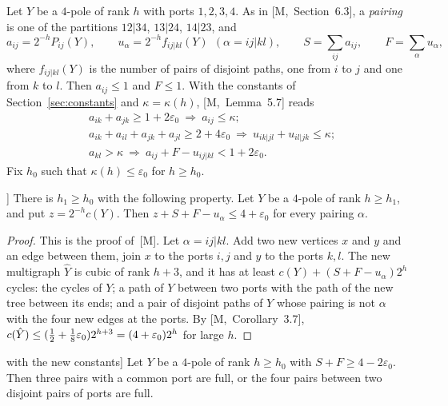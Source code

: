 \documentclass[11pt]{article}
\newcommand{\M}[1]{[M,~#1]}
\begin{document}
Let $Y$ be a $4$-pole of rank $h$ with ports $1,2,3,4$. As in \M{Section~6.3}, a \emph{pairing}
is one of the partitions $12|34$, $13|24$, $14|23$, and
\[
  a_{ij}=2^{-h}P_{ij}(Y),\qquad u_\alpha=2^{-h}f_{ij|kl}(Y)\ \ (\alpha=ij|kl),\qquad
  S=\sum_{ij}a_{ij},\qquad F=\sum_\alpha u_\alpha ,
\]
where $f_{ij|kl}(Y)$ is the number of pairs of disjoint paths, one from $i$ to $j$ and one from
$k$ to $l$. Then $a_{ij}\le1$ and $F\le1$. With the constants of Section~\ref{sec:constants} and
$\kappa=\kappa(h)$, \M{Lemma~5.7} reads
\begin{align}
  &a_{ik}+a_{jk}\ge1+2\varepsilon_0\ \Longrightarrow\ a_{ij}\le\kappa;\label{eq:T1}\\
  &a_{ik}+a_{il}+a_{jk}+a_{jl}\ge2+4\varepsilon_0\ \Longrightarrow\ u_{ik|jl}+u_{il|jk}\le\kappa;\label{eq:T2}\\
  &a_{kl}>\kappa\ \Longrightarrow\ a_{ij}+F-u_{ij|kl}<1+2\varepsilon_0.\label{eq:T3}
\end{align}
Fix $h_0$ such that $\kappa(h)\le\varepsilon_0$ for $h\ge h_0$.

\begin{lemma}[Cap; \M{Lemma~6.5}]\label{lem:cap}
There is $h_1\ge h_0$ with the following property. Let $Y$ be a $4$-pole of rank $h\ge h_1$, and
put $z=2^{-h}c(Y)$. Then $z+S+F-u_\alpha\le4+\varepsilon_0$ for every pairing $\alpha$.
\end{lemma}

\begin{proof}
This is the proof of~[M]. Let $\alpha=ij|kl$. Add two new vertices $x$ and $y$ and an edge
between them, join $x$ to the ports $i,j$ and $y$ to the ports $k,l$. The new multigraph
$\hat Y$ is cubic of rank $h+3$, and it has at least $c(Y)+(S+F-u_\alpha)2^{h}$ cycles: the cycles
of $Y$; a path of $Y$ between two ports with the path of the new tree between its ends; and a
pair of disjoint paths of $Y$ whose pairing is not $\alpha$ with the four new edges at the ports.
By \M{Corollary~3.7}, $c(\hat Y)\le(\tfrac12+\frac18\varepsilon_0)2^{h+3}=(4+\varepsilon_0)2^{h}$ for
large $h$.
\end{proof}

\begin{lemma}[Rigidity; \M{Lemma~6.6} with the new constants]\label{lem:rigid}
Let $Y$ be a $4$-pole of rank $h\ge h_0$ with $S+F\ge4-2\varepsilon_0$. Then three pairs with a
common port are full, or the four pairs between two disjoint pairs of ports are full.
\end{lemma}
\end{document}
